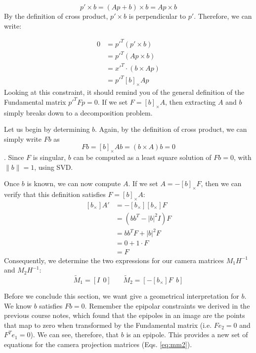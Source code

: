 \documentclass[a4paper, 12pt]{article}
\numberwithin{equation}{section}
\begin{document}
\begin{equation}
    p' \times b = (Ap+b) \times b = Ap \times b 
    \label{eq:xptimesb}
\end{equation}
By the definition of cross product, $p' \times b$ is perpendicular to $p'$. Therefore, we can write:

\begin{equation}
    \begin{split}
        0 &= p'^T  ( p' \times b )  \\
        &= p'^T  (Ap \times b )\\
        &= x'^T \cdot (b \times Ap) \\
        & = p'^T[b]_\times Ap
    \end{split}
    \label{eq:xpdot1}
\end{equation}
Looking at this constraint, it should remind you of the general definition of the Fundamental matrix $p'^T Fp = 0$. If we set $F=[b]_\times A$, then extracting $A$ and $b$ simply breaks down to a decomposition problem. 

Let us begin by determining $b$. Again, by the definition of cross product, we can simply write $Fb$ as 
\begin{equation}
    Fb = [b]_\times A b = (b\times A)b = 0
    \label{eq:cross_b}
\end{equation}.  
Since $F$ is singular, $b$ can be computed as a least square solution of $F b = 0$, with $\|b\|=1$, using SVD. 

Once $b$ is known, we can now compute $A$. If we set $A=-[b]_\times F$, then we can verify that this definition satisfies $F = [b]_\times A$:
\begin{equation}
    \begin{split}
        [b_\times]A' &= -[b_\times][b_\times]F \\
        & =(bb^T - |b|^2I)F \\
        &= bb^TF + |b|^2F \\
        &= 0 + 1\cdot F \\
        &=F
    \end{split}
    \label{eq:bap}
\end{equation}
Consequently, we determine the two expressions for our camera matrices $M_1H^{-1}$ and $M_2H^{-1}$:
\begin{equation}
    \tilde{M}_1 = [I ~~ 0] ~~~~~~~~ \tilde{M}_2 = [- [b_\times]F ~~ b]
    \label{eq:mm}
\end{equation}

Before we conclude this section, we want give a geometrical interpretation for $b$. We know $b$ satisfies $Fb=0$. Remember the epipolar constraints we derived in the previous course notes, which found that the epipoles in an image are the points that map to zero when transformed by the Fundamental matrix (i.e. $Fe_2=0$ and $F^T e_1=0$). We can see, therefore, that $b$ is an epipole. This provides a new set of equations for the camera projection matrices (Eqs. \ref{eq:mm2}). 
\end{document}
